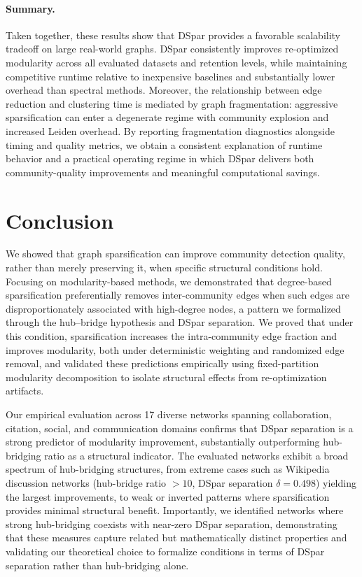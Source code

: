 \documentclass[10pt,journal,compsoc]{IEEEtran}
\begin{document}
\paragraph{Summary.}
Taken together, these results show that DSpar provides a favorable scalability tradeoff on large real-world graphs.
DSpar consistently improves re-optimized modularity across all evaluated datasets and retention levels, while maintaining competitive runtime relative to inexpensive baselines and substantially lower overhead than spectral methods.
Moreover, the relationship between edge reduction and clustering time is mediated by graph fragmentation: aggressive sparsification can enter a degenerate regime with community explosion and increased Leiden overhead.
By reporting fragmentation diagnostics alongside timing and quality metrics, we obtain a consistent explanation of runtime behavior and a practical operating regime in which DSpar delivers both community-quality improvements and meaningful computational savings.


\section{Conclusion}
We showed that graph sparsification can improve community detection quality, rather than merely preserving it, when specific structural conditions hold. Focusing on modularity-based methods, we demonstrated that degree-based sparsification preferentially removes inter-community edges when such edges are disproportionately associated with high-degree nodes, a pattern we formalized through the hub–bridge hypothesis and DSpar separation. We proved that under this condition, sparsification increases the intra-community edge fraction and improves modularity, both under deterministic weighting and randomized edge removal, and validated these predictions empirically using fixed-partition modularity decomposition to isolate structural effects from re-optimization artifacts. 

Our empirical evaluation across 17 diverse networks spanning collaboration, citation, social, and communication domains confirms that DSpar separation is a strong predictor of modularity improvement, substantially outperforming hub-bridging ratio as a structural indicator. The evaluated networks exhibit a broad spectrum of hub-bridging structures, from extreme cases such as Wikipedia discussion networks (hub-bridge ratio $> 10$, DSpar separation $\delta = 0.498$) yielding the largest improvements, to weak or inverted patterns where sparsification provides minimal structural benefit. Importantly, we identified networks where strong hub-bridging coexists with near-zero DSpar separation, demonstrating that these measures capture related but mathematically distinct properties and validating our theoretical choice to formalize conditions in terms of DSpar separation rather than hub-bridging alone.
\end{document}
